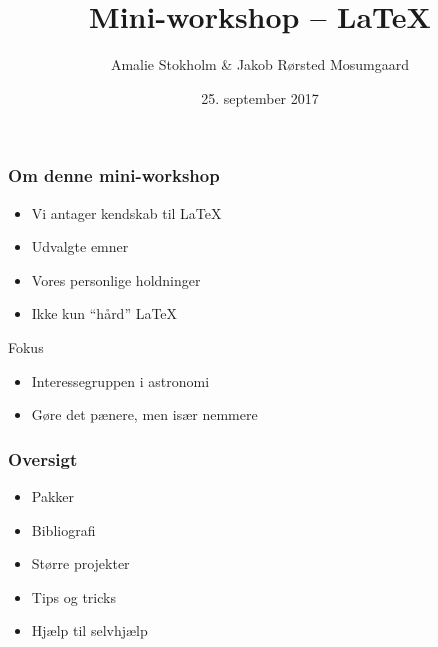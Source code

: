 \documentclass{beamer}
\newcommand{\plainbreak}[1]{\vspace{#1\baselineskip}}
\begin{document}




\title{Mini-workshop -- \LaTeX{}}
\date{25. september 2017}
\author{Amalie Stokholm \& Jakob Rørsted Mosumgaard}

\maketitle


\begin{frame}
  \frametitle{Om denne mini-workshop}

  \begin{itemize}
  \item Vi antager kendskab til \LaTeX{}
  \item Udvalgte emner
  \item Vores personlige holdninger
  \item Ikke kun \enquote{hård} \LaTeX{}
  \end{itemize}

  \plainbreak1

  \begin{block}{Fokus}
    \begin{itemize}
    \item Interessegruppen i astronomi
    \item Gøre det pænere, men især \alert{nemmere}
    \end{itemize}
  \end{block}
\end{frame}


\begin{frame}
  \frametitle{Oversigt}

  \begin{itemize}
  \item Pakker
  \item Bibliografi
  \item Større projekter
  \item Tips og tricks
  \item Hjælp til selvhjælp
  \end{itemize}

\end{frame}
\end{document}
